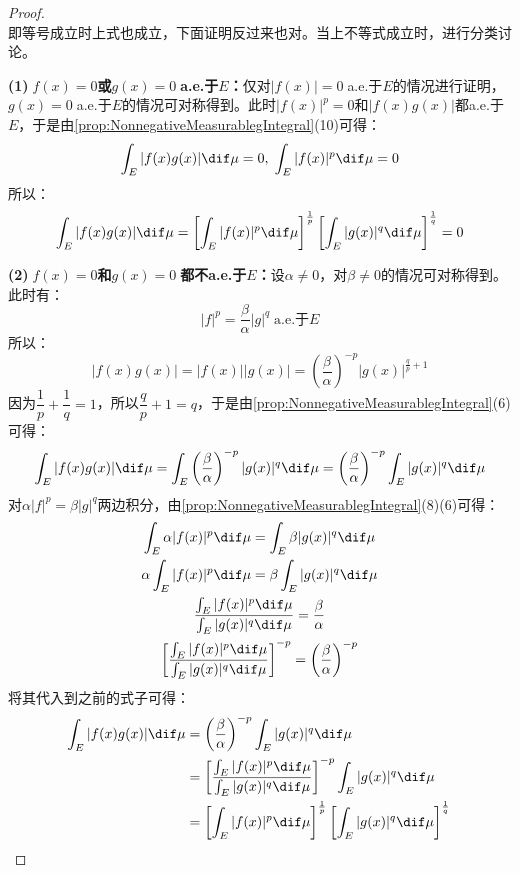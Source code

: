 \begin{proof}
\begin{equation*}
	\end{equation*}
	即等号成立时上式也成立，下面证明反过来也对。当上不等式成立时，进行分类讨论。\par
	\textbf{(1)$\;f(x)=0$或$g(x)=0\;$a.e.于$E$：}仅对$|f(x)|=0\;$a.e.于$E$的情况进行证明，$g(x)=0\;$a.e.于$E$的情况可对称得到。此时$|f(x)|^p=0$和$|f(x)g(x)|$都a.e.于$E$，于是由\cref{prop:NonnegativeMeasurablegIntegral}(10)可得：
	\begin{equation*}
		\int_{E}|f(x)g(x)|\dif\mu=0,\;\int_{E}|f(x)|^p\dif\mu=0
	\end{equation*}
	所以：
	\begin{equation*}
		\int_{E}^{}|f(x)g(x)|\dif \mu=\left[\int_{E}^{}|f(x)|^p\dif\mu\right]^{\frac{1}{p}}\left[\int_{E}^{}|g(x)|^q\dif\mu\right]^{\frac{1}{q}}=0
	\end{equation*}\par
	\textbf{(2)$\;f(x)=0$和$g(x)=0\;$都不a.e.于$E$：}设$\alpha\ne0$，对$\beta\ne0$的情况可对称得到。此时有：
	\begin{equation*}
		|f|^p=\frac{\beta}{\alpha}|g|^q\;\text{a.e.于$E$}
	\end{equation*}
	所以：
	\begin{equation*}
		|f(x)g(x)|=|f(x)||g(x)|=\left(\frac{\beta}{\alpha}\right)^{-p}|g(x)|^{\frac{q}{p}+1}
	\end{equation*}
	因为$\dfrac{1}{p}+\dfrac{1}{q}=1$，所以$\dfrac{q}{p}+1=q$，于是由\cref{prop:NonnegativeMeasurablegIntegral}(6)可得：
	\begin{equation*}
		\int_{E}|f(x)g(x)|\dif\mu=\int_{E}\left(\frac{\beta}{\alpha}\right)^{-p}|g(x)|^{q}\dif\mu=\left(\frac{\beta}{\alpha}\right)^{-p}\int_{E}|g(x)|^q\dif\mu
	\end{equation*}
	对$\alpha|f|^p=\beta|g|^q$两边积分，由\cref{prop:NonnegativeMeasurablegIntegral}(8)(6)可得：
	\begin{gather*}
		\int_{E}\alpha|f(x)|^p\dif\mu=\int_{E}\beta |g(x)|^q\dif\mu \\
		\alpha\int_{E}|f(x)|^p\dif\mu=\beta\int_{E}|g(x)|^q\dif\mu \\
		\frac{\int_{E}|f(x)|^p\dif\mu}{\int_{E}|g(x)|^q\dif\mu}=\frac{\beta}{\alpha} \\
		\left[\frac{\int_{E}|f(x)|^p\dif\mu}{\int_{E}|g(x)|^q\dif\mu}\right]^{-p}=\left(\frac{\beta}{\alpha}\right)^{-p}
	\end{gather*}
	将其代入到之前的式子可得：
	\begin{align*}
		\int_{E}|f(x)g(x)|\dif\mu&=\left(\frac{\beta}{\alpha}\right)^{-p}\int_{E}|g(x)|^q\dif\mu \\
		&=\left[\frac{\int_{E}|f(x)|^p\dif\mu}{\int_{E}|g(x)|^q\dif\mu}\right]^{-p}\int_{E}|g(x)|^q\dif\mu \\
		&=\left[\int_{E}|f(x)|^p\dif\mu\right]^{\frac{1}{p}}\left[\int_{E}|g(x)|^q\dif\mu\right]^{\frac{1}{q}}\qedhere
	\end{align*}
\end{proof}
